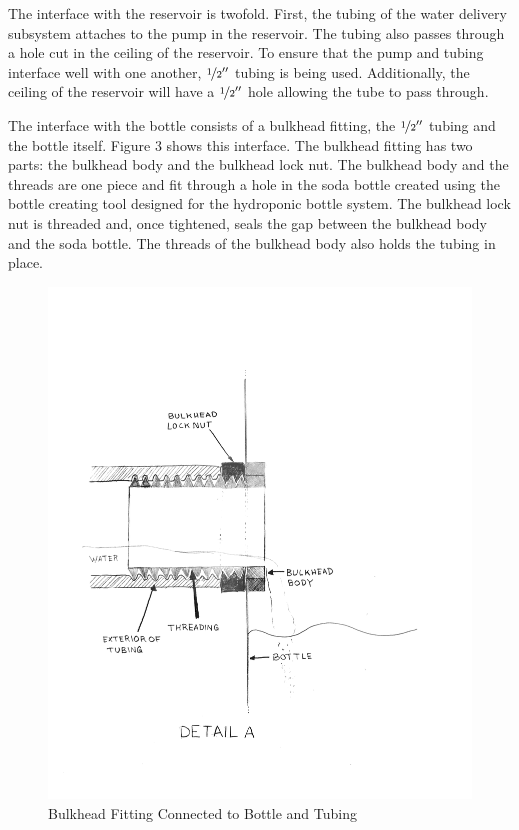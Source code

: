 \documentclass[12pt]{article}
\begin{document}
The interface with the reservoir is twofold. First, the tubing of the water delivery subsystem
attaches to the pump in the reservoir. The tubing also passes through a hole cut in the ceiling of
the reservoir. To ensure that the pump and tubing interface well with one another,
$\nicefrac{1}{2}''$ tubing is being used. Additionally, the ceiling of the reservoir will have a
$\nicefrac{1}{2}''$ hole allowing the tube to pass through.

The interface with the bottle consists of a bulkhead fitting, the $\nicefrac{1}{2}''$ tubing and the
bottle itself. Figure 3 shows this interface. The bulkhead fitting has two parts: the bulkhead
body and the bulkhead lock nut. The bulkhead body and the threads are one piece and fit through a
hole in the soda bottle created using the bottle creating tool designed for the hydroponic bottle
system. The bulkhead lock nut is threaded and, once tightened, seals the gap between the bulkhead
body and the soda bottle. The threads of the bulkhead body also holds the tubing in place.

\begin{figure}[H]
    \centering
    \includegraphics[width=163mm]{resources/detail-a.png}
    \caption{Bulkhead Fitting Connected to Bottle and Tubing}
\end{figure}
\end{document}
